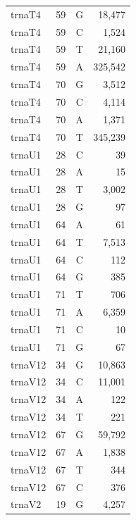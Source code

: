 \documentclass[12pt]{rockefeller}
\begin{document}
\begin{tiny}
\begin{longtable}{|l|r|c|r|}
  trnaT4 &        59 &          G &     18,477 \\
  trnaT4 &        59 &          C &      1,524 \\
  trnaT4 &        59 &          T &     21,160 \\
  trnaT4 &        59 &          A &    325,542 \\
  trnaT4 &        70 &          G &      3,512 \\
  trnaT4 &        70 &          C &      4,114 \\
  trnaT4 &        70 &          A &      1,371 \\
  trnaT4 &        70 &          T &    345,239 \\
  trnaU1 &        28 &          C &         39 \\
  trnaU1 &        28 &          A &         15 \\
  trnaU1 &        28 &          T &      3,002 \\
  trnaU1 &        28 &          G &         97 \\
  trnaU1 &        64 &          A &         61 \\
  trnaU1 &        64 &          T &      7,513 \\
  trnaU1 &        64 &          C &        112 \\
  trnaU1 &        64 &          G &        385 \\
  trnaU1 &        71 &          T &        706 \\
  trnaU1 &        71 &          A &      6,359 \\
  trnaU1 &        71 &          C &         10 \\
  trnaU1 &        71 &          G &         67 \\
 trnaV12 &        34 &          G &     10,863 \\
 trnaV12 &        34 &          C &     11,001 \\
 trnaV12 &        34 &          A &        122 \\
 trnaV12 &        34 &          T &        221 \\
 trnaV12 &        67 &          G &     59,792 \\
 trnaV12 &        67 &          A &      1,838 \\
 trnaV12 &        67 &          T &        344 \\
 trnaV12 &        67 &          C &        376 \\
  trnaV2 &        19 &          G &      4,257 \\

\end{longtable}
\end{tiny}
\end{document}
